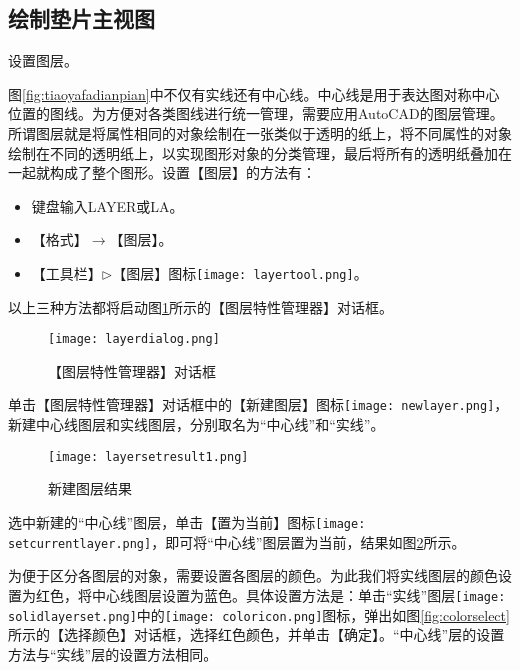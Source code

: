 
\subsection{绘制垫片主视图}\label{sec:dianpian}
\begin{procedure}
\item 设置图层。

图\ref{fig:tiaoyafadianpian}中不仅有实线还有中心线。中心线是用于表达图对称中心位置的图线。为方便对各类图线进行统一管理，需要应用AutoCAD的图层管理。所谓图层就是将属性相同的对象绘制在一张类似于透明的纸上，将不同属性的对象绘制在不同的透明纸上，以实现图形对象的分类管理，最后将所有的透明纸叠加在一起就构成了整个图形。设置【图层】的方法有：
\begin{itemize}
\item 键盘输入LAYER或LA。
\item 【格式】$\rightarrow$【图层】。
\item 【工具栏】$\triangleright$【图层】图标\texttt{[image: layertool.png]}。
\end{itemize}
以上三种方法都将启动图\ref{fig:layerdialog}所示的【图层特性管理器】对话框。
\begin{figure}[htbp]
\centering
\texttt{[image: layerdialog.png]}
\caption{【图层特性管理器】对话框}\label{fig:layerdialog}
\end{figure}

单击【图层特性管理器】对话框中的【新建图层】图标\texttt{[image: newlayer.png]}，新建中心线图层和实线图层，分别取名为“中心线”和“实线”。

\begin{figure}[htbp]
\centering
\texttt{[image: layersetresult1.png]}
\caption{新建图层结果}\label{fig:layersetresult1}
\end{figure}

选中新建的“中心线”图层，单击【置为当前】图标\texttt{[image: setcurrentlayer.png]}，即可将“中心线”图层置为当前，结果如图\ref{fig:layersetresult1}所示。

为便于区分各图层的对象，需要设置各图层的颜色。为此我们将实线图层的颜色设置为红色，将中心线图层设置为蓝色。具体设置方法是：单击“实线”图层\texttt{[image: solidlayerset.png]}中的\texttt{[image: coloricon.png]}图标，弹出如图\ref{fig:colorselect}所示的【选择颜色】对话框，选择红色颜色，并单击【确定】。“中心线”层的设置方法与“实线”层的设置方法相同。

\begin{figure}[htbp]
\centering
\begin{floatrow}
\end{floatrow}
\end{figure}


\end{procedure}

